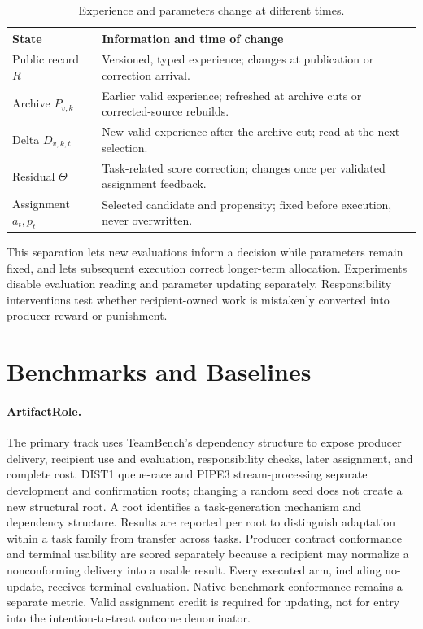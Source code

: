 \documentclass[sigconf,anonymous]{aamas}
\begin{document}
\begin{table}[t]
\centering\small
\begin{tabular}{@{}p{}p{}@{}}
\toprule
State & Information and time of change \\
\midrule
Public record $R$ & Versioned, typed experience; changes at publication or correction arrival. \\
Archive $P_{v,k}$ & Earlier valid experience; refreshed at archive cuts or corrected-source rebuilds. \\
Delta $D_{v,k,t}$ & New valid experience after the archive cut; read at the next selection. \\
Residual $\Theta$ & Task-related score correction; changes once per validated assignment feedback. \\
Assignment $a_t,p_t$ & Selected candidate and propensity; fixed before execution, never overwritten. \\
\bottomrule
\end{tabular}
\caption{Experience and parameters change at different times.}
\label{tab:state-timing}
\end{table}

This separation lets new evaluations inform a decision while parameters remain fixed, and lets subsequent execution correct longer-term allocation. Experiments disable evaluation reading and parameter updating separately. Responsibility interventions test whether recipient-owned work is mistakenly converted into producer reward or punishment.

\section{Benchmarks and Baselines}
\paragraph{ArtifactRole.} The primary track uses TeamBench's dependency structure \cite{kim2026teambench} to expose producer delivery, recipient use and evaluation, responsibility checks, later assignment, and complete cost. DIST1 queue-race and PIPE3 stream-processing separate development and confirmation roots; changing a random seed does not create a new structural root. A root identifies a task-generation mechanism and dependency structure. Results are reported per root to distinguish adaptation within a task family from transfer across tasks. Producer contract conformance and terminal usability are scored separately because a recipient may normalize a nonconforming delivery into a usable result. Every executed arm, including no-update, receives terminal evaluation. Native benchmark conformance remains a separate metric. Valid assignment credit is required for updating, not for entry into the intention-to-treat outcome denominator.
\end{document}
